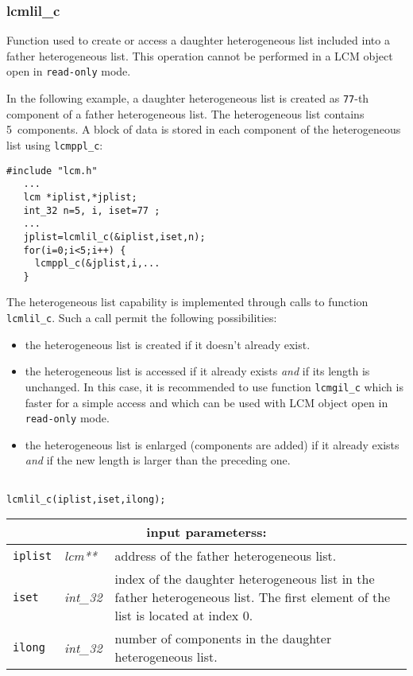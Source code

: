 \subsubsection{lcmlil\_c}

Function used to create or access a daughter heterogeneous list included into a father heterogeneous list. This operation cannot be
performed in a LCM object open in {\tt read-only} mode.

\vskip 0.2cm

In the following example, a daughter heterogeneous list is created as {\tt 77}-th component
of a father heterogeneous list. The heterogeneous list contains 5~components. A block of data
is stored in each component of the heterogeneous list using {\tt lcmppl\_c}:

\begin{verbatim}
#include "lcm.h"
   ...
   lcm *iplist,*jplist;
   int_32 n=5, i, iset=77 ;
   ...
   jplist=lcmlil_c(&iplist,iset,n);
   for(i=0;i<5;i++) {
     lcmppl_c(&jplist,i,...
   }
\end{verbatim}

\vskip 0.2cm

The heterogeneous list capability is implemented through calls to function {\tt lcmlil\_c}. Such a
call permit the following possibilities:
\begin{itemize}
\item the heterogeneous list is created if it doesn't already exist.
\item the heterogeneous list is accessed if it already exists {\sl and} if its length is unchanged. In this case,
it is recommended to use function {\tt lcmgil\_c} which is faster for a simple access and which can be used
with LCM object open in {\tt read-only} mode.
\item the heterogeneous list is enlarged (components are added) if it already exists {\sl and} if the new length is larger than the preceding one.
\end{itemize}

\begin{verbatim}

lcmlil_c(iplist,iset,ilong);
\end{verbatim}

\noindent
\begin{tabular}{|p{1.5cm}|p{2cm}|p{11cm}|}
\hline
\multicolumn{3}{|c|}{\bf input parameterss:} \\
\hline
{\tt iplist} & {\it lcm**} & address of the father heterogeneous list. \\
\hline
{\tt iset} & {\it int\_32} & index of the daughter heterogeneous list in the father heterogeneous list.
The first element of the list is located at index $0$. \\
\hline
{\tt ilong} & {\it int\_32} & number of components in the daughter heterogeneous list. \\
\hline
\end{tabular}

